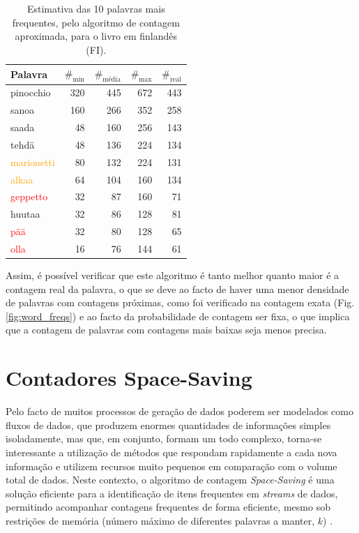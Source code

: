 \documentclass[mirror, portugues]{revdetua}
\begin{document}
\begin{table}[H]
\centering
\caption{Estimativa das 10 palavras mais frequentes, pelo algoritmo de contagem aproximada, para o livro em finlandês (FI).}
\label{table:top10_aprox_finlandes}
\begin{tabular}{lrrr|r}
\toprule
Palavra & $\text{\#}_{\text{min}}$ & $\text{\#}_{\text{média}}$ & $\text{\#}_{\text{max}}$ & $\text{\#}_{\text{real}}$ \\
\midrule
pinocchio & 320 & 445 & 672 & 443 \\
sanoa & 160 & 266 & 352 & 258 \\
saada & 48 & 160 & 256 & 143 \\
tehdä & 48 & 136 & 224 & 134 \\
\textcolor{orange}{marionetti} & 80 & 132 & 224 & 131 \\
\textcolor{orange}{alkaa} & 64 & 104 & 160 & 134 \\
\textcolor{red}{geppetto} & 32 & 87 & 160 & 71 \\
huutaa & 32 & 86 & 128 & 81 \\
\textcolor{red}{pää} & 32 & 80 & 128 & 65 \\
\textcolor{red}{olla} & 16 & 76 & 144 & 61 \\
\bottomrule
\end{tabular}
\end{table}

Assim, é possível verificar que este algoritmo é tanto melhor quanto maior é a contagem real da palavra, o que se deve ao facto de haver uma menor densidade de palavras com contagens próximas, como foi verificado na contagem exata (Fig. \ref{fig:word_freqs}) e ao facto da probabilidade de contagem ser fixa, o que implica que a contagem de palavras com contagens mais baixas seja menos precisa.

\section{Contadores Space-Saving}

Pelo facto de muitos processos de geração de dados poderem ser modelados como fluxos de dados, que produzem enormes quantidades de informações simples isoladamente, mas que, em conjunto, formam um todo complexo, torna-se interessante a utilização de métodos que respondam rapidamente a cada nova informação e utilizem recursos muito pequenos em comparação com o volume total de dados. Neste contexto, o algoritmo de contagem \textit{Space-Saving} é uma solução eficiente para a identificação de itens frequentes em \textit{streams} de dados, permitindo acompanhar contagens frequentes de forma eficiente, mesmo sob restrições de memória (número máximo de diferentes palavras a manter, $k$) \cite{CG09}.
\end{document}
